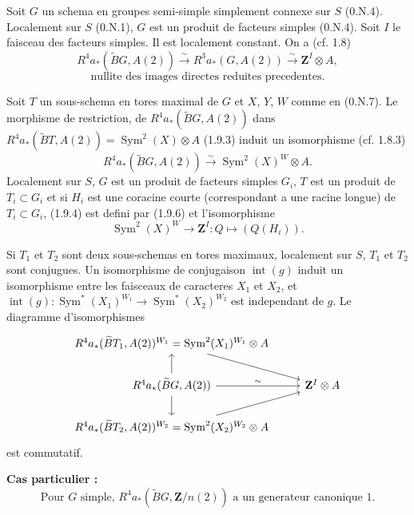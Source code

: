 \documentclass[11pt,a4paper]{article}
\theoremstyle{plain}
\theoremstyle{definition}
\DeclareMathOperator{\Sym}{Sym}
\DeclareMathOperator{\intt}{int}
\begin{document}
Soit $G$ un schema en groupes semi-simple simplement connexe sur $S$ (0.N.4). Localement sur $S$ (0.N.1), $G$ est un produit de facteurs simples (0.N.4). Soit $I$ le faisceau des facteurs simples. Il est localement constant. On a (cf. 1.8)
\begin{equation}\label{1.9.4}
R^4 a_*(\widetilde{B}G, A(2)) \xrightarrow{\sim} R^3 a_*(G, A(2)) \xrightarrow{\sim} \mathbf{Z}^I \otimes A,
\end{equation}
\begin{equation}\label{1.9.5}
\text{nullite des images directes reduites precedentes.}
\end{equation}

Soit $T$ un sous-schema en tores maximal de $G$ et $X$, $Y$, $W$ comme en (0.N.7). Le morphisme de restriction, de $R^4 a_*(\widetilde{B}G, A(2))$ dans $R^4 a_*(\widetilde{B}T, A(2)) = \Sym^2(X) \otimes A$ (1.9.3) induit un isomorphisme (cf. 1.8.3)
\begin{equation}\label{1.9.6}
R^4 a_*(\widetilde{B}G, A(2)) \xrightarrow{\sim} \Sym^2(X)^W \otimes A.
\end{equation}
Localement sur $S$, $G$ est un produit de facteurs simples $G_i$, $T$ est un produit de $T_i \subset G_i$ et si $H_i$ est une coracine courte (correspondant a une racine longue) de $T_i \subset G_i$, (1.9.4) est defini par (1.9.6) et l'isomorphisme
\begin{equation}\label{1.9.7}
\Sym^2(X)^W \to \mathbf{Z}^I : Q \mapsto (Q(H_i)).
\end{equation}

Si $T_1$ et $T_2$ sont deux sous-schemas en tores maximaux, localement sur $S$, $T_1$ et $T_2$ sont conjugues. Un isomorphisme de conjugaison $\intt(g)$ induit un isomorphisme entre les faisceaux de caracteres $X_1$ et $X_2$, et $\intt(g) : \Sym^*(X_1)^{W_1} \to \Sym^*(X_2)^{W_2}$ est independant de $g$. Le diagramme d'isomorphismes
\begin{equation}\label{1.9.8}
\begin{tikzcd}
R^4 a_*(\widetilde{B}T_1, A(2))^{W_1} = \Sym^2(X_1)^{W_1} \otimes A \arrow{dr} \\
R^4 a_*(\widetilde{B}G, A(2)) \arrow{u} \arrow{r}{\sim} \arrow{d} & \mathbf{Z}^I \otimes A \\
R^4 a_*(\widetilde{B}T_2, A(2))^{W_2} = \Sym^2(X_2)^{W_2} \otimes A \arrow{ur}
\end{tikzcd}
\end{equation}
est commutatif.

\textbf{Cas particulier :}
\begin{equation}\label{1.9.9}
\text{Pour } G \text{ simple, } R^4 a_*(\widetilde{B}G, \mathbf{Z}/n(2)) \text{ a un generateur canonique } 1.
\end{equation}
\end{document}
